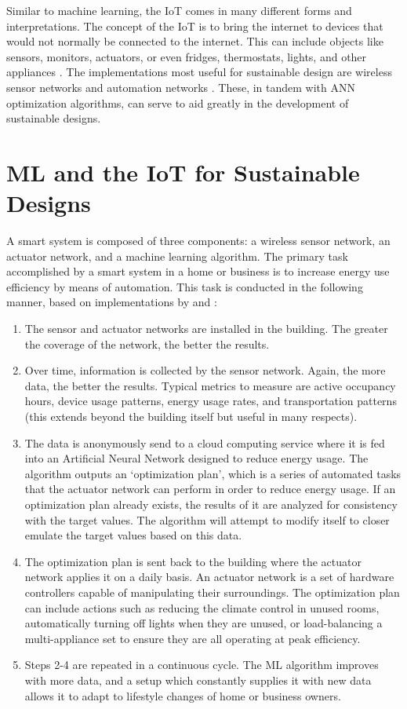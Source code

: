 \documentclass[letterpaper]{article}
\begin{document}
Similar to machine learning, the IoT comes in many different forms and interpretations. The concept of the IoT is to bring the internet to devices that would not normally be connected to the internet. This can include objects like sensors, monitors, actuators, or even fridges, thermostats, lights, and other appliances \cite{wortmann15}. The implementations most useful for sustainable design are wireless sensor networks and automation networks \cite{atzori10}. These, in tandem with ANN optimization algorithms, can serve to aid greatly in the development of sustainable designs.

\section{ML and the IoT for Sustainable Designs} \label{main}
A smart system is composed of three components: a wireless sensor network, an actuator network, and a machine learning algorithm. The primary task accomplished by a smart system in a home or business is to increase energy use efficiency by means of automation. This task is conducted in the following manner, based on implementations by \textcite{pang15} and \textcite{risteska17}:

\begin{center}
\begin{enumerate}
\item
    The sensor and actuator networks are installed in the building. The greater the coverage of the network, the better the results.
\item
    Over time, information is collected by the sensor network. Again, the more data, the better the results. Typical metrics to measure are active occupancy hours, device usage patterns, energy usage rates, and transportation patterns (this extends beyond the building itself but useful in many respects).
\item
    The data is anonymously send to a cloud computing service where it is fed into an Artificial Neural Network designed to reduce energy usage. The algorithm outputs an `optimization plan', which is a series of automated tasks that the actuator network can perform in order to reduce energy usage. If an optimization plan already exists, the results of it are analyzed for consistency with the target values. The algorithm will attempt to modify itself to closer emulate the target values based on this data.
\item
    The optimization plan is sent back to the building where the actuator network applies it on a daily basis. An actuator network is a set of hardware controllers capable of manipulating their surroundings. The optimization plan can include actions such as reducing the climate control in unused rooms, automatically turning off lights when they are unused, or load-balancing a multi-appliance set to ensure they are all operating at peak efficiency.
\item
    Steps 2-4 are repeated in a continuous cycle. The ML algorithm improves with more data, and a setup which constantly supplies it with new data allows it to adapt to lifestyle changes of home or business owners.
\end{enumerate}
\end{center}
\end{document}
